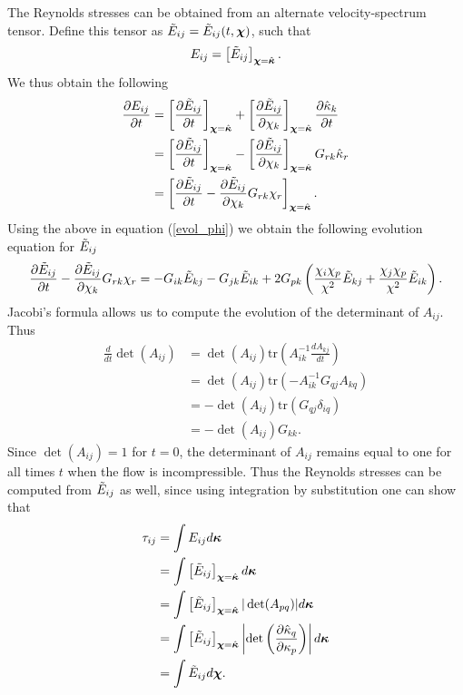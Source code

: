 \documentclass[oneside,a4paper,11pt]{report}
\begin{document}
The Reynolds stresses can be obtained from an alternate velocity-spectrum tensor. Define this tensor as $\tilde{E}_{ij} = \tilde{E}_{ij}(t,\boldsymbol\chi)$, such that
\begin{equation}
E_{ij} = \left [ \tilde{E}_{ij} \right ]_{\boldsymbol\chi = \hat{\boldsymbol\kappa}}.
\end{equation}
We thus obtain the following
\begin{align}
\frac{\partial{E_{ij}}}{\partial t} &= \left [ \frac{ \partial \tilde{E}_{ij} }{\partial t} \right ]_{\boldsymbol\chi = \hat{\boldsymbol\kappa}} + \left [ \frac{\partial \tilde{E}_{ij} }{\partial \chi_k} \right ]_{\boldsymbol\chi = \hat{\boldsymbol\kappa} } \frac{\partial \hat{\kappa}_k }{\partial t} \nonumber \\
& = \left [ \frac{\partial \tilde{E}_{ij} }{\partial t} \right ]_{\boldsymbol\chi = \hat{\boldsymbol\kappa} } - \left [ \frac{\partial \tilde{E}_{ij} }{\partial \chi_k} \right ]_{\boldsymbol\chi = \hat{\boldsymbol\kappa} } G_{rk} \hat{\kappa}_r \nonumber \\
& = \left [ \frac{\partial \tilde{E}_{ij}}{\partial t} - \frac{\partial \tilde{E}_{ij}}{\partial \chi_k} G_{rk}\chi_r \right ]_{\boldsymbol\chi = \hat{\boldsymbol\kappa} }.
\end{align}
Using the above in equation (\ref{evol_phi}) we obtain the following evolution equation for $\tilde{E}_{ij}$
\begin{equation}
\frac{\partial \tilde{E}_{ij}}{\partial t} - \frac{\partial \tilde{E}_{ij}}{\partial \chi_k} G_{rk}\chi_r =
-G_{ik} \tilde{E}_{kj} - G_{jk}\tilde{E}_{ik} + 2 G_{pk} \left ( \frac{\chi_i \chi_p}{\chi^2} \tilde{E}_{kj} + \frac{\chi_j \chi_p}{\chi^2} \tilde{E}_{ik} \right ).
\end{equation}
Jacobi's formula allows us to compute the evolution of the determinant of $A_{ij}$. Thus
\begin{align}
\frac{d}{dt} \det(A_{ij}) & = \det(A_{ij}) \text{tr}\left( A^{-1}_{ik} \frac{d A_{kj}}{dt} \right ) \nonumber \\
& = \det(A_{ij}) \text{tr} ( -A^{-1}_{ik} G_{qj} A_{kq} ) \nonumber \\
& = -\det(A_{ij}) \text{tr} (G_{qj} \delta_{iq}) \nonumber \\
& = -\det(A_{ij}) G_{kk}.
\end{align}
Since $\det(A_{ij}) = 1$ for $t = 0$, the determinant of $A_{ij}$ remains equal to one for all times $t$ when the flow is incompressible. Thus the Reynolds stresses can be computed from $\tilde{E}_{ij}$ as well, since using integration by substitution one can show that
\begin{align}
\tau_{ij} &= \int E_{ij} d\boldsymbol\kappa \nonumber \\
&= \int \left [ \tilde{E}_{ij} \right ]_{\boldsymbol\chi = \hat{\boldsymbol\kappa} } d\boldsymbol\kappa \nonumber \\
&= \int \left [ \tilde{E}_{ij} \right ]_{\boldsymbol\chi = \hat{\boldsymbol\kappa}} | \det(A_{pq}) | d\boldsymbol\kappa \nonumber \\
&= \int \left [ \tilde{E}_{ij} \right ]_{\boldsymbol\chi = \hat{\boldsymbol\kappa}} \left | \det \left (\frac{\partial \hat{\kappa}_q}{\partial \kappa_p} \right ) \right | d\boldsymbol\kappa \nonumber \\
&= \int \tilde{E}_{ij} d\boldsymbol\chi.
\end{align}
\end{document}
